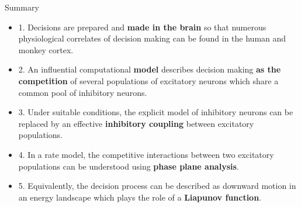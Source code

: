 \documentclass[xcolor=table,dvipsnames,svgnames,aspectratio=169,fontset=fandol]{ctexbeamer}
\begin{document}
\begin{frame}{Summary}
  \begin{itemize}
    \item 1. Decisions are prepared and \textbf{made in the brain} so that numerous physiological correlates of decision making can be found in the human and monkey cortex.
    \item 2. An influential computational \textbf{model} describes decision making \textbf{as the competition} of several populations of excitatory neurons which share a common pool of inhibitory neurons. 
    \item 3. Under suitable conditions, the explicit model of inhibitory neurons can be replaced by an effective \textbf{inhibitory coupling} between excitatory populations.
    \item 4. In a rate model, the competitive interactions between two excitatory populations can be understood using \textbf{phase plane analysis}.
    \item 5. Equivalently, the decision process can be described as downward motion in an energy landscape which plays the role of a \textbf{Liapunov function}.
  \end{itemize}
\end{frame}













\makebottom
\end{document}

